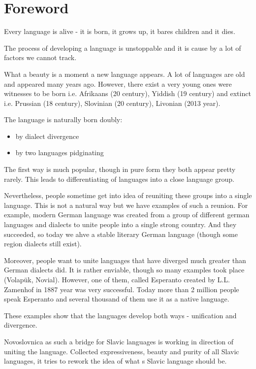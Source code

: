 \chapter{Foreword}

Every language is alive - it is born, it grows up, it bares children and it dies.

The process of developing a language is unstoppable and it is cause by a lot of factors we cannot track.

What a beauty is a moment a new language appears. A lot of languages are old and appeared many years ago. However, there exist a very young ones were witnesses to be born i.e. Afrikaans (20 century), Yiddish (19 century) and extinct i.e. Prussian (18 century), Slovinian (20 century), Livonian (2013 year).

The language is naturally born doubly:

\begin{itemize}
	\item by dialect divergence
	\item by two languages pidginating 
\end{itemize}

The first way is much popular, though in pure form they both appear pretty rarely. This leads to differentiating of languages into a close language group.

Nevertheless, people sometime get into idea of reuniting these groups into a single language. This is not a natural way but we have examples of such a reunion. For example, modern German language was created from a group of different german languages and dialects to unite people into a single strong country. And they succeeded, so today we ahve a stable literary German language (though some region dialects still exist).

Moreover, people want to unite languages that have diverged much greater than German dialects did. It is rather enviable, though so many examples took place (Volapük, Novial). However, one of them, called Esperanto created by L.L. Zamenhof in 1887 year was very successful. Today more than 2 million people speak Esperanto and several thousand of them use it as a native language.

These examples show that the languages develop both ways - unification and divergence.

Novoslovnica as such a bridge for Slavic languages is working in direction of uniting the language. Collected expressiveness, beauty and purity of all Slavic languages, it tries to rework the idea of what s Slavic language should be.

